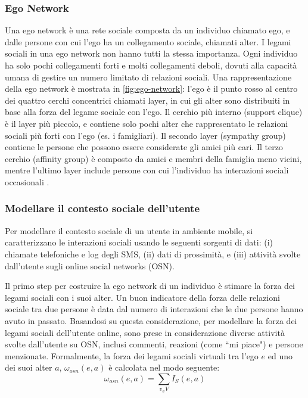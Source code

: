 \documentclass[12pt,italian]{report}
\begin{document}
\subsubsection{Ego Network}
Una ego network è una rete sociale composta da un individuo chiamato ego, e dalle persone con cui l'ego ha un collegamento sociale, chiamati alter. I legami sociali in una ego network non hanno tutti la stessa importanza. Ogni individuo ha solo pochi collegamenti forti e molti collegamenti deboli, dovuti alla capacità umana di gestire un numero limitato di relazioni sociali. Una rappresentazione della ego network è mostrata in \autoref{fig:ego-network}: l'ego è il punto rosso al centro dei quattro cerchi concentrici chiamati layer, in cui gli alter sono distribuiti in base alla forza del legame sociale con l'ego. Il cerchio più interno (support clique) è il layer più piccolo, e contiene solo pochi alter che rappresentato le relazioni sociali più forti con l'ego (es. i famigliari). Il secondo layer (sympathy group) contiene le persone che possono essere considerate gli amici più cari. Il terzo cerchio (affinity group) è composto da amici e membri della famiglia meno vicini, mentre l'ultimo layer include persone con cui l'individuo ha interazioni sociali occasionali \cite{ego-net}.

\subsubsection{Modellare il contesto sociale dell'utente}
Per modellare il contesto sociale di un utente in ambiente mobile, si caratterizzano le interazioni sociali usando le seguenti sorgenti di dati: (i) chiamate telefoniche e log degli SMS, (ii) dati di prossimità, e (iii) attività svolte dall'utente sugli online social networks (OSN).

Il primo step per costruire la ego network di un individuo è stimare la forza dei legami sociali con i suoi alter. Un buon indicatore della forza delle relazioni sociale tra due persone è data dal numero di interazioni che le due persone hanno avuto in passato. Basandosi su questa considerazione, per modellare la forza dei legami sociali dell'utente online, sono prese in considerazione diverse attività svolte dall'utente su OSN, inclusi commenti, reazioni (come ``mi piace") e persone menzionate. Formalmente, la forza dei legami sociali virtuali tra l'ego $e$ ed uno dei suoi alter $a$, $\omega_{osn}(e,a)$ è calcolata nel modo seguente:
\begin{equation}	
	\omega_{osn}(e,a)=\sum_{v_\in V}I_S (e, a)
\end{equation}
\end{document}
